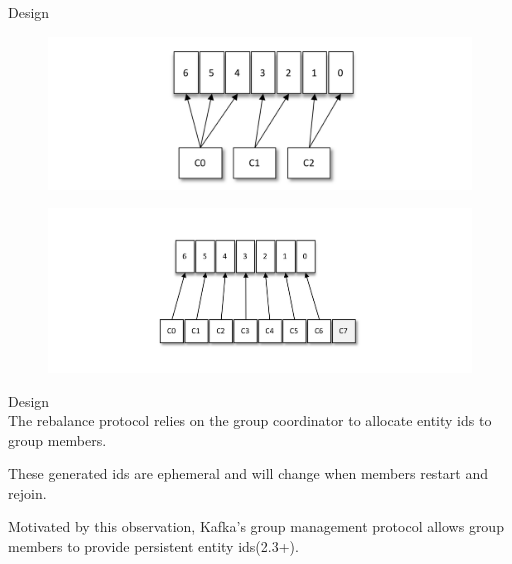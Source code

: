 \begin{frame}[plain,t]{Design} %
     \\
       \begin{figure}
        \centering
        \includegraphics[width=0.9\linewidth]{image/0208}
        \label{fig:0208}
    \end{figure}
\vspace{-4ex}
    \begin{figure}
        \centering
        \includegraphics[width=0.9\linewidth]{image/0209}
        \label{fig:0209}
    \end{figure}
    
    
\end{frame}
\begin{frame}[plain,t]{Design} %
     \\
    \vspace{2ex}
    The rebalance protocol relies on the group coordinator to allocate entity ids to group members. 
    
     \vspace{2ex}
    These generated ids are ephemeral and will change when members restart and rejoin. 
    
     \vspace{2ex}
    Motivated by this observation, Kafka’s group management protocol allows group members to provide persistent entity ids(2.3+).
    
    
\end{frame}


